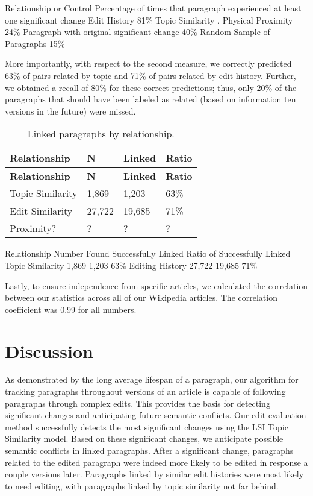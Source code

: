 Relationship or Control Percentage of times that paragraph experienced
at least one significant change Edit History 81\% Topic Similarity .
Physical Proximity 24\% Paragraph with original significant change 40\%
Random Sample of Paragraphs 15\%

More importantly, with respect to the second measure, we correctly
predicted 63\% of pairs related by topic and 71\% of pairs related by
edit history. Further, we obtained a recall of 80\% for these correct
predictions; thus, only 20\% of the paragraphs that should have been
labeled as related (based on information ten versions in the future)
were missed.

\begin{longtable}[c]{@{}llll@{}}
\caption{Linked paragraphs by relationship.{}}\tabularnewline
\toprule
\textbf{Relationship} & \textbf{N} & \textbf{Linked} &
\textbf{Ratio}\tabularnewline
\midrule
\endfirsthead
\toprule
\textbf{Relationship} & \textbf{N} & \textbf{Linked} &
\textbf{Ratio}\tabularnewline
\midrule
\endhead
Topic Similarity & 1,869 & 1,203 & 63\%\tabularnewline
Edit Similarity & 27,722 & 19,685 & 71\%\tabularnewline
Proximity? & ? & ? & ?\tabularnewline
\bottomrule
\end{longtable}

Relationship Number Found Successfully Linked Ratio of Successfully
Linked Topic Similarity 1,869 1,203 63\% Editing History 27,722 19,685
71\%

Lastly, to ensure independence from specific articles, we calculated the
correlation between our statistics across all of our Wikipedia articles.
The correlation coefficient was 0.99 for all numbers.

\section{Discussion}\label{discussion}

As demonstrated by the long average lifespan of a paragraph, our
algorithm for tracking paragraphs throughout versions of an article is
capable of following paragraphs through complex edits. This provides the
basis for detecting significant changes and anticipating future semantic
conflicts. Our edit evaluation method successfully detects the most
significant changes using the LSI Topic Similarity model. Based on these
significant changes, we anticipate possible semantic conflicts in linked
paragraphs. After a significant change, paragraphs related to the edited
paragraph were indeed more likely to be edited in response a couple
versions later. Paragraphs linked by similar edit histories were most
likely to need editing, with paragraphs linked by topic similarity not
far behind.

